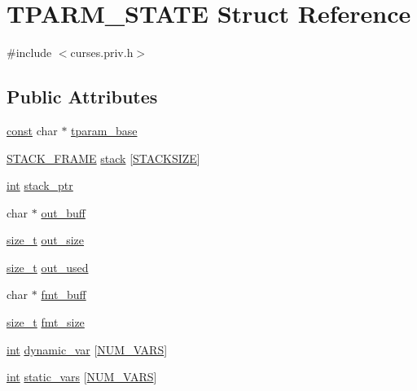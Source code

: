 \hypertarget{struct_t_p_a_r_m___s_t_a_t_e}{\section{T\-P\-A\-R\-M\-\_\-\-S\-T\-A\-T\-E Struct Reference}
\label{struct_t_p_a_r_m___s_t_a_t_e}
}


{\ttfamily \#include $<$curses.\-priv.\-h$>$}

\subsection*{Public Attributes}
\begin{DoxyCompactItemize}
\item 
\hyperlink{term__entry_8h_a57bd63ce7f9a353488880e3de6692d5a}{const} char $\ast$ \hyperlink{struct_t_p_a_r_m___s_t_a_t_e_a1f4948bf33bc1df1c3697e9abe770184}{tparam\-\_\-base}
\item 
\hyperlink{struct_s_t_a_c_k___f_r_a_m_e}{S\-T\-A\-C\-K\-\_\-\-F\-R\-A\-M\-E} \hyperlink{struct_t_p_a_r_m___s_t_a_t_e_a39a05de696bf015f0540c850a7b3dec7}{stack} \mbox{[}\hyperlink{curses_8priv_8h_a21d9543c516fffee84a7963224271f95}{S\-T\-A\-C\-K\-S\-I\-Z\-E}\mbox{]}
\item 
\hyperlink{term__entry_8h_ad65b480f8c8270356b45a9890f6499ae}{int} \hyperlink{struct_t_p_a_r_m___s_t_a_t_e_a0f9baf26857d6d6dc9ec08a89c1b6627}{stack\-\_\-ptr}
\item 
char $\ast$ \hyperlink{struct_t_p_a_r_m___s_t_a_t_e_aea33a69c1950186df846eef1d022e4ab}{out\-\_\-buff}
\item 
\hyperlink{nc__alloc_8h_a7b60c5629e55e8ec87a4547dd4abced4}{size\-\_\-t} \hyperlink{struct_t_p_a_r_m___s_t_a_t_e_aa273fd16f98c975fe2596b3164461730}{out\-\_\-size}
\item 
\hyperlink{nc__alloc_8h_a7b60c5629e55e8ec87a4547dd4abced4}{size\-\_\-t} \hyperlink{struct_t_p_a_r_m___s_t_a_t_e_a66dbb32b3ca4a154877ee4f367856e2b}{out\-\_\-used}
\item 
char $\ast$ \hyperlink{struct_t_p_a_r_m___s_t_a_t_e_a833fef5783f7a782c6641fd839125eac}{fmt\-\_\-buff}
\item 
\hyperlink{nc__alloc_8h_a7b60c5629e55e8ec87a4547dd4abced4}{size\-\_\-t} \hyperlink{struct_t_p_a_r_m___s_t_a_t_e_abb3d0a50ed0bb05913858c6b7f510cbf}{fmt\-\_\-size}
\item 
\hyperlink{term__entry_8h_ad65b480f8c8270356b45a9890f6499ae}{int} \hyperlink{struct_t_p_a_r_m___s_t_a_t_e_a248cbcfacb778c44b01d85639eab0011}{dynamic\-\_\-var} \mbox{[}\hyperlink{curses_8priv_8h_a56487323585c1b73f01a0e01e875027e}{N\-U\-M\-\_\-\-V\-A\-R\-S}\mbox{]}
\item 
\hyperlink{term__entry_8h_ad65b480f8c8270356b45a9890f6499ae}{int} \hyperlink{struct_t_p_a_r_m___s_t_a_t_e_aa80b41416e895bd37dfdbb801b2f2e6c}{static\-\_\-vars} \mbox{[}\hyperlink{curses_8priv_8h_a56487323585c1b73f01a0e01e875027e}{N\-U\-M\-\_\-\-V\-A\-R\-S}\mbox{]}
\end{DoxyCompactItemize}


